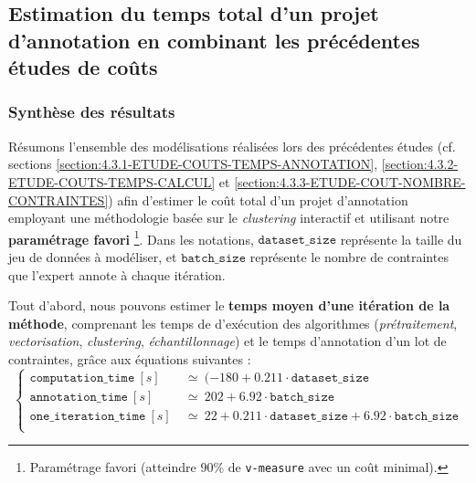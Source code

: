 	\subsection{Estimation du temps total d'un projet d'annotation en combinant les précédentes études de coûts}
	\label{section:4.3.4-ETUDE-COUTS-TOTAL}

		\subsubsection{Synthèse des résultats}
	
			Résumons l'ensemble des modélisations réalisées lors des précédentes études (cf. sections \ref{section:4.3.1-ETUDE-COUTS-TEMPS-ANNOTATION}, \ref{section:4.3.2-ETUDE-COUTS-TEMPS-CALCUL} et \ref{section:4.3.3-ETUDE-COUT-NOMBRE-CONTRAINTES}) afin d'estimer le coût total d'un projet d'annotation employant une méthodologie basée sur le \textit{clustering} interactif et utilisant notre \textbf{paramétrage favori}
			\footnote{Paramétrage favori (atteindre $90$\% de \texttt{v-measure} avec un coût minimal).}.
			Dans les notations, $\texttt{dataset\_size}$ représente la taille du jeu de données à modéliser, et $\texttt{batch\_size}$ représente le nombre de contraintes que l'expert annote à chaque itération.
			
			Tout d'abord, nous pouvons estimer le \textbf{temps moyen d'une itération de la méthode}, comprenant les temps de d'exécution des algorithmes (\textit{prétraitement}, \textit{vectorisation}, \textit{clustering}, \textit{échantillonnage}) et le temps d'annotation d'un lot de contraintes, grâce aux équations suivantes :
			\begin{equation}
				\label{equation:4.3.4-ETUDE-COUT-UNE-ITERATION}
				\begin{cases}
					\texttt{computation\_time}~[s]&
						~\simeq~(-180 + 0.211 \cdot \texttt{dataset\_size} \\
					\texttt{annotation\_time}~[s]&
						~\simeq~202 + 6.92 \cdot \texttt{batch\_size} \\
					\texttt{one\_iteration\_time}~[s]&
						~\simeq~22 + 0.211 \cdot \texttt{dataset\_size} + 6.92 \cdot \texttt{batch\_size} \\
				\end{cases}
			\end{equation}
			
